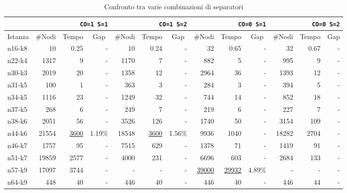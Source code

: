 \documentclass[11pt,oneside,a4paper]{article}
\begin{document}
\begin{sidewaystable}
\begin{tabularx}{\textwidth}{|l|rrr|rrr|rrr|rrr|}
\cline{2-13}

\multicolumn{1}{c|}{} &
\multicolumn{3}{C|}{\tt{CO=1 S=1}} &
\multicolumn{3}{C|}{\tt{CO=1 S=2}} &
\multicolumn{3}{C|}{\tt{CO=0 S=1}} &
\multicolumn{3}{C|}{\tt{CO=0 S=2}} \\

\hline
\multicolumn{1}{|l|}{Istanza} &
\multicolumn{1}{c}{\#Nodi} &
\multicolumn{1}{c}{Tempo} & 
\multicolumn{1}{c|}{Gap} &
\multicolumn{1}{c}{\#Nodi} &
\multicolumn{1}{c}{Tempo} & 
\multicolumn{1}{c|}{Gap} &
\multicolumn{1}{c}{\#Nodi} &
\multicolumn{1}{c}{Tempo} & 
\multicolumn{1}{c|}{Gap} &
\multicolumn{1}{c}{\#Nodi} &
\multicolumn{1}{c}{Tempo} &
\multicolumn{1}{c|}{Gap} \\

\hline
n16-k8 & 10 & 0.25 & -
       & 10 & 0.24 & -
       & 32 & 0.65 & -
       & 32 & 0.67 & - \\
n22-k4 & 1317 & 9 & - 
       & 1170 & 7 & -
       & 882 & 5 & -
       & 995 & 9 & - \\
n30-k3 & 2019 & 20 & -
       & 1358 & 12 & -
       & 2964 & 36 & -
       & 1393 & 12 & - \\
n31-k5 & 100 & 1 & -
       & 363 & 3 & -
       & 284 & 3 & -
       & 394 & 5 & - \\
n34-k5 & 1116 & 23 & -
       & 1249 & 32 & -
       & 744 & 14 & -
       & 852 & 18 & - \\
n37-k5 & 268 & 6 & -
       & 249 & 7 & -
       & 219 & 6 & -
       & 227 & 7 & - \\
n38-k6 & 2051 & 56 & -
       & 3526 & 126 & -
       & 1740 & 50 & -
       & 3154 & 109 &  -\\
n44-k6 & 21554 & \underline{3600} & 1.19\%
       & 18548 & \underline{3600} & 1.56\%
       & 9936 & 1040 & -
       & 18282 & 2704 & - \\
n46-k7 & 1757 & 95 & -
       & 7515 & 629 & -
       & 1378 & 71 & -
       & 1419 & 91 & - \\
n51-k7 & 19859 & 2577 & -
       & 4000 & 231 & -
       & 6696 & 603 & -
       & 2684 & 133 & - \\
n57-k9 & 17097 & 3744 & -
       & - & - & -
       & \underline{39000} & \underline{29932} & 4.89\%
       & - & - & - \\
n64-k9 & 448 & 40 & -
       & 446 & 40 & -
       & 446 & 40 & -
       & 446 & 44 & - \\

\hline

\end{tabularx}
\caption{Confronto tra varie combinazioni di separatori}\label{t_var:sep}
\end{sidewaystable}
\end{document}
